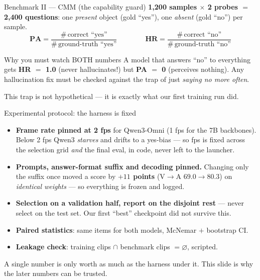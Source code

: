 \documentclass[aspectratio=169,11pt]{beamer}
\begin{document}
\begin{frame}{Benchmark II --- CMM (the capability guard)}
\centering
{\footnotesize \textbf{1,200 samples $\times$ 2 probes $=$ 2,400 questions}: one \emph{present} object
(gold ``yes''), one \emph{absent} (gold ``no'') per sample.}
\vspace{0.5em}
\[
\mathbf{PA}=\frac{\#\,\text{correct ``yes''}}{\#\,\text{ground-truth ``yes''}}
\qquad\qquad
\mathbf{HR}=\frac{\#\,\text{correct ``no''}}{\#\,\text{ground-truth ``no''}}
\]
\vspace{0.2em}
\begin{center}
\begin{block}{Why you must watch BOTH numbers}
\centering\small A model that answers ``no'' to everything gets \textbf{HR $=$ 1.0} (never hallucinates!)
but \textbf{PA $=$ 0} (perceives nothing). Any hallucination fix must be checked against the trap of
just \emph{saying no more often}.
\end{block}
\end{center}
\vfill
{\footnotesize This trap is not hypothetical --- it is exactly what our first training run did.}
\end{frame}

\begin{frame}{Experimental protocol: the harness is fixed}
\begin{itemize}\small
\item \textbf{Frame rate pinned at 2 fps} for Qwen3-Omni (1 fps for the 7B backbones). Below 2 fps
Qwen3 \emph{starves} and drifts to a yes-bias --- so fps is fixed across the selection grid
\emph{and} the final eval, in code, never left to the launcher.
\item \textbf{Prompts, answer-format suffix and decoding pinned.} Changing only the suffix once moved a
score by \textbf{$+11$ points} (V$\to$A $69.0\to80.3$) on \emph{identical weights} --- so everything
is frozen and logged.
\item \textbf{Selection on a validation half, report on the disjoint rest} --- never select on the
test set. Our first ``best'' checkpoint did not survive this.
\item \textbf{Paired statistics}: same items for both models, McNemar $+$ bootstrap CI.
\item \textbf{Leakage check}: training clips $\cap$ benchmark clips $=\varnothing$, scripted.
\end{itemize}
\vfill
\begin{center}
\begin{block}{}
\centering\small A single number is only worth as much as the harness under it. This slide is why the
later numbers can be trusted.
\end{block}
\end{center}
\end{frame}
\end{document}
